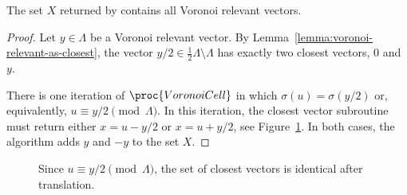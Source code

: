 \begin{lemma}
  \label{lemma:voronoi-cell-computation}
  The set $X$ returned by  contains all Voronoi relevant vectors.
\end{lemma}
\begin{proof}
  Let $y \in \Lambda$ be a Voronoi relevant vector.
  By Lemma~\ref{lemma:voronoi-relevant-as-closest},
  the vector $y/2 \in \frac{1}{2}\Lambda \setminus \Lambda$ has exactly two closest vectors,
  $0$ and $y$.

  There is one iteration of $\proc{VoronoiCell}$ in which $\sigma(u) = \sigma(y/2)$
  or, equivalently, $u \equiv y/2 \pmod{\Lambda}$.
  In this iteration, the closest vector subroutine must return
  either $x = u - y/2$ or $x = u + y/2$, see Figure~\ref{fig:voronoi-cell-computation}.
  In both cases, the algorithm adds $y$ and $-y$ to the set $X$.
\end{proof}
\begin{figure}
  \begin{center}
  \end{center}
  \caption{Since $u \equiv y/2 \pmod\Lambda$, the set of closest vectors is identical after translation.}
  \label{fig:voronoi-cell-computation}
\end{figure}

